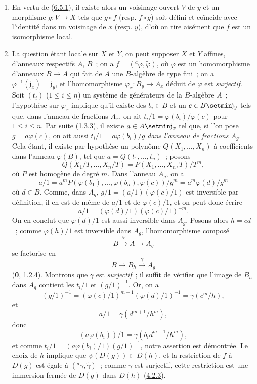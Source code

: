 \begin{enumerate}
  \item[(ii)] En vertu de (\hyperref[I.6.5.1-fr]{6.5.1}), il existe alors un
    voisinage ouvert $V$ de $y$ et un morphisme $g:V\to X$ tels que $g\circ f$
    (resp. $f\circ g$) soit défini et coïncide avec l'identité dans un
    voisinage de $x$ (resp. $y$), d'où on tire aisément que $f$ est un
    isomorphisme local.
  \item[(i)] La question étant locale sur $X$ et $Y$, on peut supposer $X$ et
    $Y$ affines, d'anneaux respectifs $A$, $B$~; on a
    $f=({}^a\varphi,\widetilde{\varphi})$, où $\varphi$ est un homomorphisme
    d'anneaux $B\to A$ qui fait de $A$ une $B$-algèbre de type fini~; on a
    $\varphi^{-1}(\mathfrak{j}_x)=\mathfrak{j}_y$, et l'homomorphisme
    $\varphi_x:B_y\to A_x$ déduit de $\varphi$ est \emph{surjectif}. Soit $(t_i)$
    ($1\leq i\leq n$) un système de générateurs de la $B$-algèbre $A$~;
    l'hypothèse sur $\varphi_x$ implique qu'il existe des $b_i\in B$ et un
    $c\in B\setmin\mathfrak{j}_y$ tels que, dans l'anneau de fractions $A_x$, on ait
    $t_i/1=\varphi(b_i)/\varphi(c)$ pour $1\leq i\leq n$. Par suite
    (\hyperref[I.1.3.3-fr]{1.3.3}), il existe $a\in A\setmin\mathfrak{j}_x$ tel que,
    si l'on pose $g=a\varphi(c)$, on ait aussi
    $t_i/1=a\varphi(b_i)/g$ \emph{dans l'anneau de fractions $A_g$}. Cela étant,
    il existe par hypothèse un polynôme $Q(X_1,\ldots,X_n)$ à coefficients dans
    l'anneau $\varphi(B)$,
    tel que $a=Q(t_1,\ldots,t_n)$~; posons
    \[
      Q(X_1/T,\ldots,X_n/T)
      =P(X_1,\ldots,X_n,T)/T^m,
    \]
    où $P$ est homogène de degré $m$. Dans l'anneau $A_g$, on a
    \[
      a/1
      =a^mP(\varphi(b_1),\ldots,\varphi(b_n),\varphi(c))/g^m
      =a^m\varphi(d)/g^m
    \]
    où $d\in B$. Comme, dans $A_g$,
    $g/1=(a/1)(\varphi(c)/1)$ est inversible par définition, il en est de même
    de $a/1$ et de $\varphi(c)/1$, et on peut donc écrire
    \[
      a/1=(\varphi(d)/1)(\varphi(c)/1)^{-m}.
    \]
    On en conclut que $\varphi(d)/1$ est aussi inversible dans $A_g$. Posons
    alors $h=cd$~; comme $\varphi(h)/1$ est inversible dans $A_g$,
    l'homomorphisme composé
    \[
      B\xrightarrow{\varphi}A\longrightarrow A_g
    \]
    se factorise en
    \[
      B\longrightarrow B_h\xrightarrow{\gamma}A_g
    \]
    (\hyperref[0.1.2.4-fr]{\textbf{0}, 1.2.4}). Montrons que $\gamma$ est
    \emph{surjectif}~; il suffit de vérifier que l'image de $B_h$ dans $A_g$
    contient les $t_i/1$ et $(g/1)^{-1}$. Or, on a
    \[
      (g/1)^{-1}
      =(\varphi(c)/1)^{m-1}(\varphi(d)/1)^{-1}
      =\gamma(c^m/h),
    \]
    et
    \[
      a/1=\gamma(d^{m+1}/h^m),
    \]
    donc
    \[
      (a\varphi(b_i))/1=\gamma(b_i d^{m+1}/h^m),
    \]
    et comme
    $t_i/1=(a\varphi(b_i)/1)(g/1)^{-1}$, notre assertion est démontrée. Le
    choix de $h$ implique que $\psi(D(g))\subset D(h)$, et la restriction de
    $f$ à $D(g)$ est égale à
    $({}^a\gamma,\widetilde{\gamma})$~; comme $\gamma$ est surjectif, cette
    restriction est une immersion fermée de $D(g)$ dans $D(h)$
    (\hyperref[I.4.2.3-fr]{4.2.3}).
\end{enumerate}

